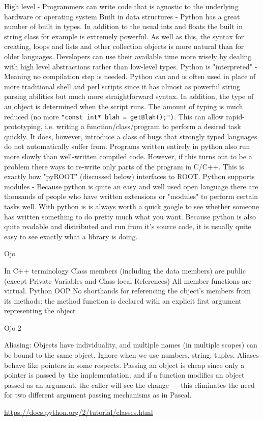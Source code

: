 High level - Programmers can write code that is agnostic to the underlying hardware or operating system
Built in data structures - Python has a great number of built in types. In addition to the usual ints and floats the built in string class for example is extremely powerful. As well as this, the syntax for creating, loops and lists and other collection objects is more natural than for older languages. Developers can use their available time more wisely by dealing with high level abstractions rather than low-level types.
Python is "interpreted" - Meaning no compilation step is needed.
Python can and is often used in place of more traditional shell and perl scripts since it has almost as powerful string parsing abilities but much more straightforward syntax.
In addition, the type of an object is determined when the script runs. The amount of typing is much reduced (no more \verb|"const int* blah = getBlah();")|. This can allow rapid-prototyping, i.e. writing a function/class/program to perform a desired task quickly. It does, however, introduce a class of bugs that strongly typed languages do not automatically suffer from.
Programs written entirely in python also run more slowly than well-written compiled code. However, if this turns out to be a problem there ways to re-write only parts of the program in C/C++. This is exactly how "pyROOT" (discussed below) interfaces to ROOT.
Python supports modules - Because python is quite an easy and well used open language there are thousands of people who have written extensions or "modules" to perform certain tasks well. With python is is always worth a quick google to see whether someone has written something to do pretty much what you want. Because python is also quite readable and distributed and run from it's source code, it is usually quite easy to see exactly what a library is doing.

 


Ojo

In C++ terminology
Class members (including the data members) are public (except Private Variables and Class-local References)
All member functions are virtual.
Python OOP
No shorthands for referencing the object’s members from its methods: the method function is declared with an explicit first argument representing the object


Ojo 2 



Aliasing: Objects have individuality, and multiple names (in multiple scopes) can be bound to the same object. Ignore when we use numbers, string, tuples. 
Aliases behave like pointers in some respects.
Passing an object is cheap since only a pointer is passed by the implementation; and if a function modifies an object passed as an argument, the caller will see the change — this eliminates the need for two different argument passing mechanisms as in Pascal.
 

\url{https://docs.python.org/2/tutorial/classes.html}




